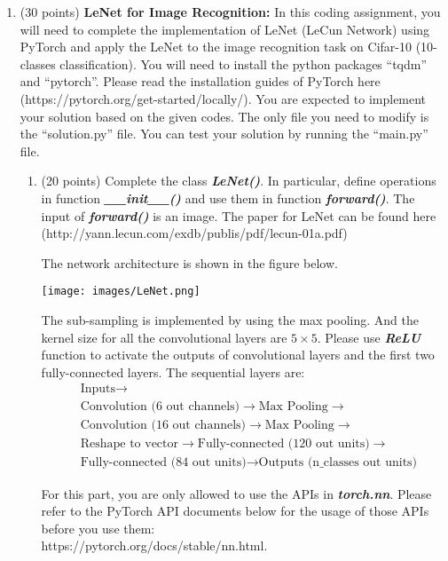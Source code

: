 \documentclass[11pt]{article}
\begin{document}
\begin{enumerate}
\begin{enumerate}
    \end{enumerate}
    
    
    \item (30 points) \textbf{LeNet for Image Recognition:} In
    this coding assignment, you will need to complete the
    implementation of LeNet (LeCun Network) using PyTorch and apply the LeNet to the image recognition task on Cifar-10 (10-classes classification). You will need to install the python packages ``tqdm'' and ``pytorch''. Please read the installation guides of PyTorch here
    (https://pytorch.org/get-started/locally/). You are expected to implement your solution based on the given codes. The only file you need to modify is the ``solution.py'' file. You can test your solution by running the ``main.py'' file.
    
    \begin{enumerate}
    \item (20 points) Complete the class \emph{\textbf{LeNet()}}.
    In particular, define operations in function
    \emph{\textbf{\_\_init\_\_()}} and use them in function
    \emph{\textbf{forward()}}. The input of
    \emph{\textbf{forward()}} is an image. The paper for LeNet
    can be found here
    (http://yann.lecun.com/exdb/publis/pdf/lecun-01a.pdf)
    
    The network architecture is shown in the figure below.
    \begin{center}
    \texttt{[image: images/LeNet.png]}
    \end{center}
    
    The sub-sampling is implemented by using the max pooling. And
    the kernel size for all the convolutional layers are $5\times
    5$. Please use \emph{\textbf{ReLU}} function to activate the
    outputs of convolutional layers and the first two
    fully-connected layers. The sequential layers are:
    \begin{align*}
    &\text{Inputs} \to \\
    &\text{Convolution (6 out channels)} \to \text{Max Pooling} \to \\
    &\text{Convolution (16 out channels)}\to \text{Max Pooling}\to\\
    &\text{Reshape to vector}\to \text{Fully-connected (120 out units)}\to \\
    &\text{Fully-connected (84 out units)}\to \text{Outputs (n\_classes out units)}
    \end{align*}
    
    For this part, you are only allowed to use the APIs in
    \emph{\textbf{torch.nn}}. Please refer to the PyTorch API documents below for the usage of those APIs before you use them: \\
    https://pytorch.org/docs/stable/nn.html.


\end{enumerate}
\end{enumerate}
\end{document}
